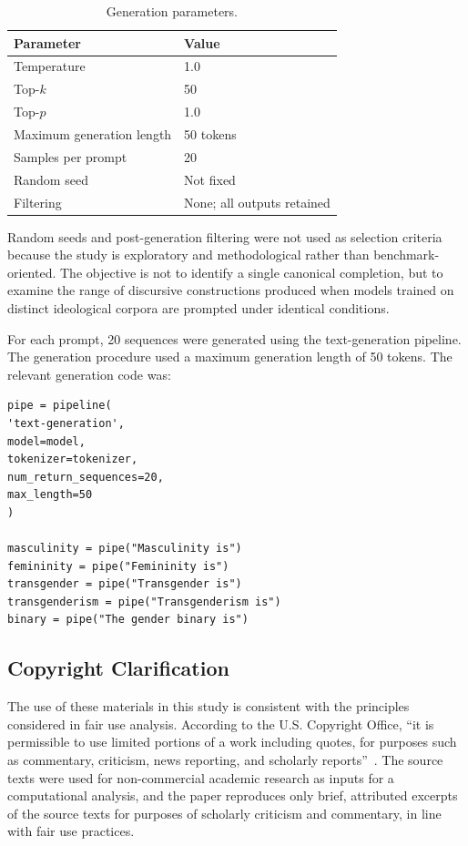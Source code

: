 \documentclass[anonymous,review]{acmart}
\begin{document}
\begin{table}[t]
\caption{Generation parameters.}
\label{tab:generation-parameters}
\centering
\begin{tabular}{ll}
\toprule
\textbf{Parameter} & \textbf{Value} \\
\midrule
Temperature & 1.0 \\
Top-$k$ & 50 \\
Top-$p$ & 1.0 \\
Maximum generation length & 50 tokens \\
Samples per prompt & 20 \\
Random seed & Not fixed \\
Filtering & None; all outputs retained \\
\bottomrule
\end{tabular}
\end{table}
Random seeds and post-generation filtering were not used as selection criteria because the study is exploratory and methodological rather than benchmark-oriented. The objective is not to identify a single canonical completion, but to examine the range of discursive constructions produced when models trained on distinct ideological corpora are prompted under identical conditions.

For each prompt, 20 sequences were generated using the text-generation pipeline. The generation procedure used a maximum generation length of 50 tokens. The relevant generation code was:

\begin{verbatim}
pipe = pipeline(
'text-generation',
model=model,
tokenizer=tokenizer,
num_return_sequences=20,
max_length=50
)

masculinity = pipe("Masculinity is")
femininity = pipe("Femininity is")
transgender = pipe("Transgender is")
transgenderism = pipe("Transgenderism is")
binary = pipe("The gender binary is")
\end{verbatim}

\subsection{Copyright Clarification}
\label{appendix:copyright}

The use of these materials in this study is consistent with the principles considered in fair use analysis. According to the U.S. Copyright Office, ``it is permissible to use limited portions of a work including quotes, for purposes such as commentary, criticism, news reporting, and scholarly reports''~\cite{copyright_fair_use}. The source texts were used for non-commercial academic research as inputs for a computational analysis, and the paper reproduces only brief, attributed excerpts of the source texts for purposes of scholarly criticism and commentary, in line with fair use practices.
\end{document}
